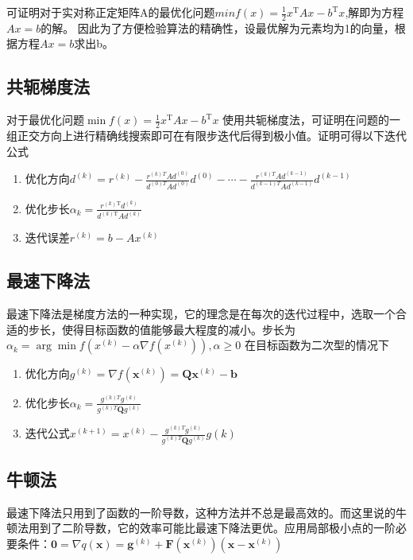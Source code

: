\documentclass[UTF8]{ctexart}
\begin{document}
可证明对于实对称正定矩阵A的最优化问题$minf(x)=\frac{1}{2} x^{\mathrm{T}} A x-b^{\mathrm{T}} x$,解即为方程$A x=b$的解。 因此为了方便检验算法的精确性，设最优解为元素均为1的向量，根据方程$A x=b$求出b。

\subsection{共轭梯度法}
对于最优化问题$\min f(x)=\frac{1}{2} x^{\mathrm{T}} A x-b^{\mathrm{T}} x$
使用共轭梯度法，可证明在问题的一组正交方向上进行精确线搜索即可在有限步迭代后得到极小值。证明可得以下迭代公式
\begin{enumerate}
	\item 优化方向$d^{(k)}=r^{(k)}-\frac{r^{(k) T} A d^{(0)}}{d^{(0) T} A d^{(0)}} d^{(0)}-\cdots-\frac{r^{(k) T} A d^{(k-1)}}{d^{(k-1) T} A d^{(k-1)}} d^{(k-1)}$
	\item 优化步长$\alpha_{k}=\frac{r^{(k) \mathrm{T}} d^{(k)}}{d^{(k) \mathrm{T}} A d^{(k)}}$
	\item 迭代误差$r^{(k)}=b-A x^{(k)}$
\end{enumerate}


\subsection{最速下降法}
最速下降法是梯度方法的一种实现，它的理念是在每次的迭代过程中，选取一个合适的步长，使得目标函数的值能够最大程度的减小。步长为$\alpha_{k}=\arg \min f\left(x^{(k)}-\alpha \nabla f\left(x^{(k)}\right)\right), \alpha \geq 0$
在目标函数为二次型的情况下
\begin{enumerate}
	\item 优化方向$g^{(k)}=\nabla f\left(\boldsymbol{x}^{(k)}\right)=\boldsymbol{Q} \boldsymbol{x}^{(k)}-\boldsymbol{b}$
	\item 优化步长$\alpha_{k}=\frac{g^{(k) T} g^{(k)}}{g^{(k) T} \boldsymbol{Q} g^{(k)}}$
	\item 迭代公式$x^{(k+1)}=x^{(k)}-\frac{g^{(k) T} g^{(k)}}{g^{(k) T} \boldsymbol{Q} g^{(k)}} g(k)$
\end{enumerate}


\subsection{牛顿法}
最速下降法只用到了函数的一阶导数，这种方法并不总是最高效的。而这里说的牛顿法用到了二阶导数，它的效率可能比最速下降法更优。应用局部极小点的一阶必要条件：$\mathbf{0}=\nabla q(\boldsymbol{x})=\boldsymbol{g}^{(k)}+\boldsymbol{F}\left(\boldsymbol{x}^{(k)}\right)\left(\boldsymbol{x}-\boldsymbol{x}^{(k)}\right)$
\end{document}
